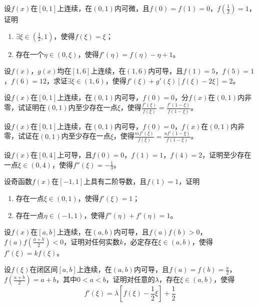 \begin{example}
	设$f(x)$在$[0,1]$上连续，在$(0,1)$内可微，且$f(0)=f(1)=0$，$f(\frac{1}{2})=1$，证明
	\begin{enumerate}
		\item $\exists\xi\in(\frac{1}{2},1)$，使得$f(\xi)=\xi$；
		\item 存在一个$\eta\in(0,\xi)$，使得$f'(\eta)=f(\eta)-\eta+1$。
	\end{enumerate}
\end{example}

\begin{example}
	设$f(x)$，$g(x)$均在$[1,6]$上连续，在$(1,6)$内可导，且$f(1)=5$，$f(5)=1$，$f(6)=12$，求证$\exists\xi\in(1,6)$，使得$f'(\xi)+g'(\xi)[f(\xi)-2\xi]=2$。
\end{example}

\begin{example}
	设$f(x)$在$[0,1]$上连续，在$(0,1)$内可导，$f(0)=0$，$分f(x)$在$(0,1)$内非零，试证明在$(0,1)$内至少存在一点$\xi$，使得$\frac{f'(\xi)}{f(\xi)}=\frac{f'(1-\xi)}{f(1-\xi)}$。
\end{example}
\begin{example}
	设$f(x)$在$[0,1]$上连续，在$(0,1)$内可导，$f(0)=0$，$f(x)$在$(0,1)$内非零，试证在$(0,1)$内至少存在一点$\xi$，使得$\frac{mf'(\xi)}{f(\xi)}=\frac{nf'(1-\xi)}{f(1-\xi)}$。
\end{example}

\begin{example}
	设$f(x)$在$[0,4]$上可导，且$f(0)=0$，$f(1)=1$，$f(4)=2$，证明至少存在一点$\xi\in(0,4)$，使得$f''(\xi)=-\frac{1}{3}$。
\end{example}

\begin{example}
	设奇函数$f(x)$在$[-1,1]$上具有二阶导数，且$f(1)=1$，证明
	\begin{enumerate}
		\item 存在一点$\xi\in(0,1)$，使得$f'(\xi)=1$；
		\item 存在一点$\eta\in(-1,1)$，使得$f''(\eta)+f'(\eta)=1$。
	\end{enumerate}
\end{example}

\begin{example}
	设$f(x)$在$[a,b]$上连续，在$(a,b)$内可导，且$f(a)f(b)>0$，$f(a)f(\frac{a+b}{2})<0$，证明对任何实数$k$，必定存在$\xi\in(a,b)$，使得$f'(\xi)=kf(\xi)$。
\end{example}

\begin{example}
	设$f(\xi)$在闭区间$[a,b]$上连续，在$(a,b)$内可导，且$f(a)=f(b)=\frac{a}{2}$，$f(\frac{a+b}{2})=a+b$，其中$0<a<b$，证明对任意的$\lambda$，存在$\xi\in(a,b)$，使得\[f'(\xi)=\lambda\left[f(\xi)-\frac{1}{2}\xi\right]+\frac{1}{2}\]
\end{example}

